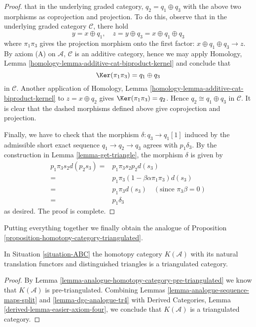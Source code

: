 \begin{proof}
that in the underlying graded category, $q_2 = q_1\oplus q_3$
with the above two morphisms as coprojection and projection.
To do this, observe that in the underlying graded category
$\mathcal{C}$, there hold
$$
y = x\oplus q_1,\quad
z = y\oplus q_3 = x\oplus q_1\oplus q_3
$$
where $\pi_1\pi_3$ gives the projection morphism onto the first
factor: $x\oplus q_1\oplus q_3\to z$. By axiom (A) on
$\mathcal{A}$, $\mathcal{C}$ is an additive category, hence
we may apply
Homology, Lemma \ref{homology-lemma-additive-cat-biproduct-kernel}
and conclude that
$$
\Ker(\pi_1\pi_3) = q_1\oplus q_3
$$
in $\mathcal{C}$. Another application of
Homology, Lemma \ref{homology-lemma-additive-cat-biproduct-kernel}
to $z = x\oplus q_2$ gives $\Ker(\pi_1\pi_3) = q_2$.
Hence $q_2\cong q_1\oplus q_3$ in $\mathcal{C}$.
It is clear that the dashed morphisms defined above give
coprojection and projection.

\medskip\noindent
Finally, we have to check that the morphism
$\delta : q_3 \to q_1[1]$ induced by the admissible
short exact sequence $q_1\to q_2\to q_3$ agrees with
$p_1\delta_3$. By the construction in
Lemma \ref{lemma-get-triangle}, the morphism $\delta$ is given by
\begin{align*}
p_1\pi_3s_2d(p_2s_3)
= &
p_1\pi_3s_2p_2d(s_3) \\
= &
p_1\pi_3(1-\beta\alpha\pi_1\pi_3)d(s_3) \\
= &
p_1\pi_3d(s_3)\quad (\text{since }\pi_3\beta = 0) \\
= &
p_1\delta_3
\end{align*}
as desired. The proof is complete.
\end{proof}

\noindent
Putting everything together we finally obtain the analogue
of Proposition \ref{proposition-homotopy-category-triangulated}.

\begin{proposition}
\label{proposition-ABC-homotopy-category-triangulated}
In Situation \ref{situation-ABC} the homotopy category $K(\mathcal{A})$
with its natural translation functors and distinguished triangles is a
triangulated category.
\end{proposition}

\begin{proof}
By Lemma \ref{lemma-analogue-homotopy-category-pre-triangulated} we know that
$K(\mathcal{A})$ is pre-triangulated. Combining
Lemmas \ref{lemma-analogue-sequence-maps-split} and
\ref{lemma-dgc-analogue-tr4} with
Derived Categories, Lemma \ref{derived-lemma-easier-axiom-four},
we conclude that $K(\mathcal{A})$ is a triangulated category.
\end{proof}








